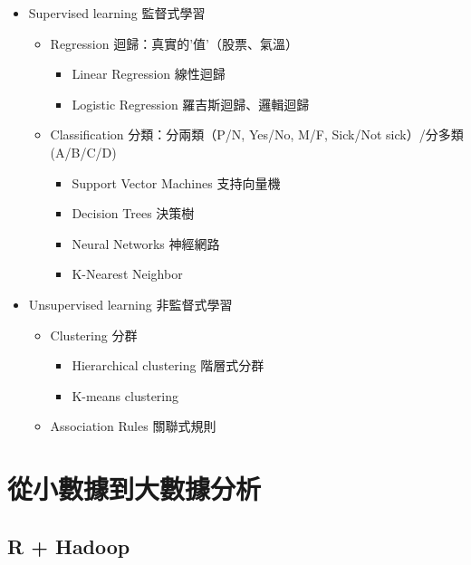 \documentclass[]{book}
\providecommand{\tightlist}{%
  \setlength{\itemsep}{0pt}\setlength{\parskip}{0pt}}
\theoremstyle{definition}
\theoremstyle{definition}
\theoremstyle{remark}
\begin{document}
\begin{itemize}
\tightlist
\item
  Supervised learning 監督式學習

  \begin{itemize}
  \tightlist
  \item
    Regression 迴歸：真實的'值'（股票、氣溫）

    \begin{itemize}
    \tightlist
    \item
      Linear Regression 線性迴歸
    \item
      Logistic Regression 羅吉斯迴歸、邏輯迴歸
    \end{itemize}
  \item
    Classification 分類：分兩類（P/N, Yes/No, M/F, Sick/Not
    sick）/分多類 (A/B/C/D)

    \begin{itemize}
    \tightlist
    \item
      Support Vector Machines 支持向量機
    \item
      Decision Trees 決策樹
    \item
      Neural Networks 神經網路
    \item
      K-Nearest Neighbor
    \end{itemize}
  \end{itemize}
\item
  Unsupervised learning 非監督式學習

  \begin{itemize}
  \tightlist
  \item
    Clustering 分群

    \begin{itemize}
    \tightlist
    \item
      Hierarchical clustering 階層式分群
    \item
      K-means clustering
    \end{itemize}
  \item
    Association Rules 關聯式規則
  \end{itemize}
\end{itemize}

\chapter{從小數據到大數據分析}\label{big}

\section{R + Hadoop}\label{r-hadoop}
\end{document}
